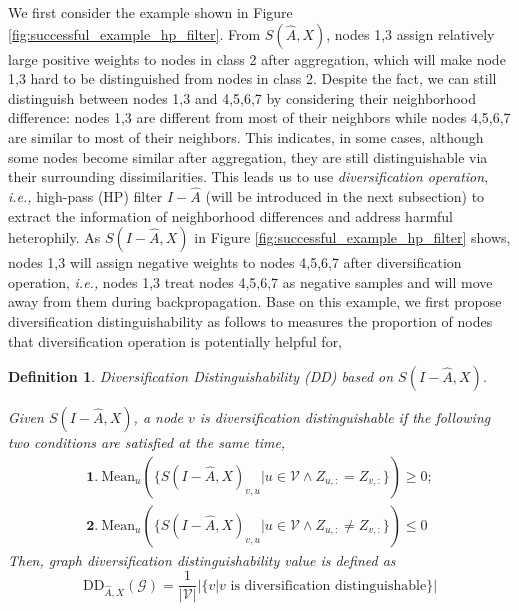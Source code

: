 \documentclass{article}
\newcommand\ie{\textit{i.e.,}}
\newcommand{\0}{{\boldsymbol{0}}}
\newcommand{\6}{{\partial}}
\newcommand{\8}{{\infty}}
\newcommand{\4}{{\nabla}}
\newtheorem{definition}{Definition}
\begin{document}
We first consider the example shown in Figure \ref{fig:successful_example_hp_filter}. From $S(\hat{A},X)$, nodes 1,3 assign relatively large positive weights to nodes in class 2 after aggregation, which will make node 1,3 hard to be distinguished from nodes in class 2. Despite the fact, we can still distinguish between nodes 1,3 and 4,5,6,7 by considering their neighborhood difference: nodes 1,3 are different from most of their neighbors while nodes 4,5,6,7 are similar to most of their neighbors. This indicates, in some cases, although some nodes become similar after aggregation, they are still distinguishable via their surrounding dissimilarities. This leads us to use \textit{diversification operation}, \ie{} high-pass (HP) filter $I-\hat{A}$ \cite{ekambaram2014graph} (will be introduced in the next subsection) to extract the information of neighborhood differences and address harmful heterophily. As $S(I-\hat{A},X)$ in Figure \ref{fig:successful_example_hp_filter} shows, nodes 1,3 will assign negative weights to nodes 4,5,6,7 after diversification operation, \ie{} nodes 1,3 treat nodes 4,5,6,7 as negative samples and will move away from them during backpropagation. Base on this example, we first propose diversification distinguishability as follows to measures the proportion of nodes that diversification operation is potentially helpful for, 
\begin{definition} Diversification Distinguishability (DD) based on $S(I-\hat{A},X)$.

Given $S(I-\hat{A},X)$, a node $v$ is diversification distinguishable if the following two conditions are satisfied at the same time,
\vspace*{-1mm}
\begin{equation}
\label{eq:diversification_distinguishability}
\begin{split}
    \textbf{1.}\ \mathrm{Mean}_u \left(\{S(I-\hat{A},X)_{v,u}|u \in \mathcal{V} \land Z_{u,:}=Z_{v,:}\} \right) \geq 0; \\
    \textbf{2.}\ \mathrm{Mean}_u \left(\{S(I-\hat{A},X)_{v,u}|u \in \mathcal{V} \land Z_{u,:} \neq Z_{v,:}\} \right) \leq 0
    \end{split}
\end{equation}
Then, graph diversification distinguishability value is defined as
\begin{equation}
    \mathrm{DD}_{\hat{A},X}(\mathcal{G}) = \frac{1}{\left|\mathcal{V}\right|} \Big|\{v|v \mbox{ is diversification distinguishable}\}\Big|
\end{equation}
\end{definition}
\end{document}
